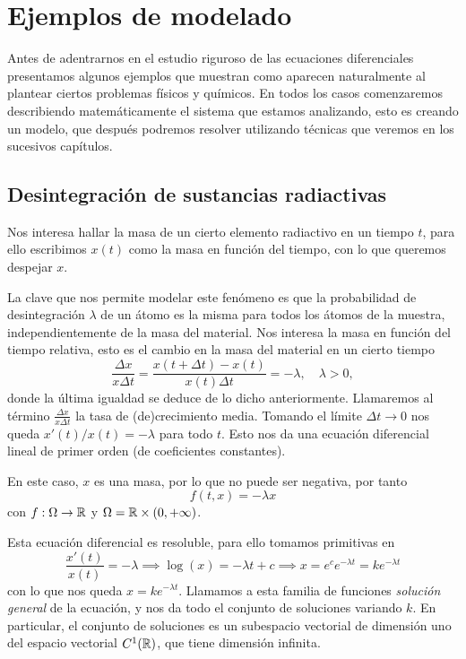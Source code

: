 \documentclass[../ecuaciones_diferenciales.tex]{subfiles}
\begin{document}
\section{Ejemplos de modelado}

Antes de adentrarnos en el estudio riguroso de las ecuaciones diferenciales
presentamos algunos ejemplos que muestran como aparecen naturalmente al plantear
ciertos problemas físicos y químicos. En todos los casos comenzaremos
describiendo matemáticamente el sistema que estamos analizando, esto es creando
un modelo, que después podremos resolver utilizando técnicas que veremos en los
sucesivos capítulos.

\subsection{Desintegración de sustancias radiactivas}

Nos interesa hallar la masa de un cierto elemento radiactivo en un tiempo \(t\),
para ello escribimos \(x(t)\) como la masa en función del tiempo, con lo que
queremos despejar \(x\).

La clave que nos permite modelar este fenómeno es que la probabilidad de 
desintegración \(\lambda\) de un átomo es la misma para todos los átomos de la 
muestra, independientemente de la masa del material.
Nos interesa la masa en función del tiempo relativa, esto es el cambio en la
masa del material en un cierto tiempo
\[\frac{\Delta x}{x \Delta t} = \frac{x(t + \Delta t) - x(t)}{x(t) \Delta t}
	= -\lambda, \quad \lambda > 0,\] 
donde la última igualdad se deduce de lo dicho anteriormente. 
Llamaremos al término \(\frac{\Delta x}{x\Delta t}\) la tasa de
(de)crecimiento media. Tomando el límite \(\Delta t \to 0\) nos queda
\(x'(t)/x(t) = -\lambda\) para todo \(t\). Esto nos da una ecuación diferencial
lineal de primer orden (de coeficientes constantes).

En este caso, \(x\) es una masa, por lo que no puede ser negativa, por tanto
\[f(t, x) = -\lambda x\]
con \(f : \Omega \to \mathbb{R}\) y \(\Omega = \mathbb{R} \times (0, +\infty)\).

Esta ecuación diferencial es resoluble, para ello tomamos primitivas en
\[\frac{x'(t)}{x(t)} = -\lambda \implies \log(x) = -\lambda t + c
	\implies x = e^c e^{-\lambda t} = k e^{-\lambda t}\] con lo que nos queda
\(x = k e^{-\lambda t}\). Llamamos a esta familia de funciones \emph{solución general}
de la ecuación, y nos da todo el conjunto de soluciones variando \(k\). En
particular, el conjunto de soluciones es un subespacio vectorial de dimensión
uno del espacio vectorial \(C^1(\mathbb{R})\), que tiene dimensión infinita.
\end{document}
